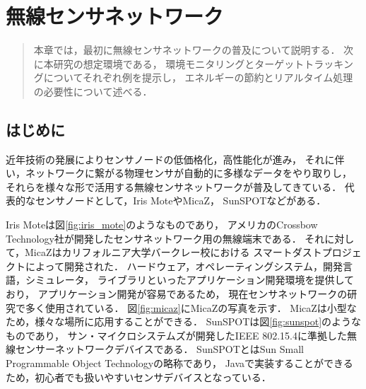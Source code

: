 \chapter{無線センサネットワーク}
\begin{large}
\begin{quote}
本章では，最初に無線センサネットワークの普及について説明する．
次に本研究の想定環境である，
環境モニタリングとターゲットトラッキングについてそれぞれ例を提示し，
エネルギーの節約とリアルタイム処理の必要性について述べる．
\end{quote}
\end{large}
\clearpage

\section{はじめに}
近年技術の発展によりセンサノードの低価格化，高性能化が進み，
それに伴い，ネットワークに繋がる物理センサが自動的に多様なデータをやり取りし，
それらを様々な形で活用する無線センサネットワークが普及してきている．
代表的なセンサノードとして，Iris MoteやMicaZ\cite{Hill:2002:MWP:623308.624560}，
SunSPOTなどがある．

Iris Moteは図\ref{fig:iris_mote}のようなものであり，
アメリカのCrossbow Technology社が開発したセンサネットワーク用の無線端末である．
それに対して，MicaZはカリフォルニア大学バークレー校における
スマートダストプロジェクト\cite{Kahn:1999:NCC:313451.313558}によって開発された．
ハードウェア，オペレーティングシステム，開発言語，シミュレータ，
ライブラリといったアプリケーション開発環境を提供しており，
アプリケーション開発が容易であるため，
現在センサネットワークの研究で多く使用されている．
図\ref{fig:micaz}にMicaZの写真を示す．
MicaZは小型なため，様々な場所に応用することができる．
SunSPOTは図\ref{fig:sunspot}のようなものであり，
サン・マイクロシステムズが開発したIEEE 802.15.4に準拠した無線センサーネットワークデバイスである．
SunSPOTとはSun Small Programmable Object Technologyの略称であり，
Javaで実装することができるため，初心者でも扱いやすいセンサデバイスとなっている．


